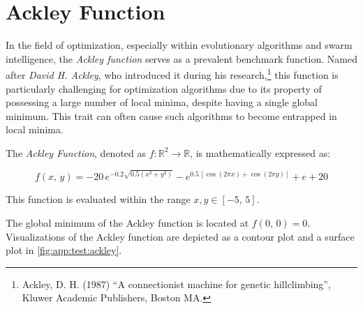 \section{Ackley Function}
\label{sec:app:test:ackley}

  In the field of optimization, especially within evolutionary algorithms and 
  swarm intelligence, the \emph{Ackley function} serves as a prevalent benchmark 
  function. 
  Named after \textit{David H. Ackley}, who introduced it during his 
  research,\footnote{%
    Ackley, D. H. (1987) \enquote{A connectionist machine for genetic 
    hillclimbing}, Kluwer Academic Publishers, Boston MA.
  } this function is particularly challenging for optimization algorithms due to
  its property of possessing a large number of local minima, despite having a
  single global minimum.
  This trait can often cause such algorithms to become entrapped in local
  minima.

\begin{definition}
  The \emph{Ackley Function}, denoted as \(f: \mathbb{R}^2 \rightarrow 
  \mathbb{R}\), is mathematically expressed as:

  \begin{equation}
    \label{eq:app:test:ackley}
    f(x,\, y) = -20\, e^{-0.2 \sqrt{0.5 (x^2 + y^2)}} - 
      e^{0.5\, [\cos(2 \pi x) + \cos(2\pi y)]} + e + 20
  \end{equation}

  This function is evaluated within the range \(x, y \in [-5,\,5]\).
\end{definition}

The global minimum of the Ackley function is located at \(f(0,\, 0) = 0\). 
Visualizations of the Ackley function are depicted as a contour plot and a 
surface plot in \vref{fig:app:test:ackley}.

